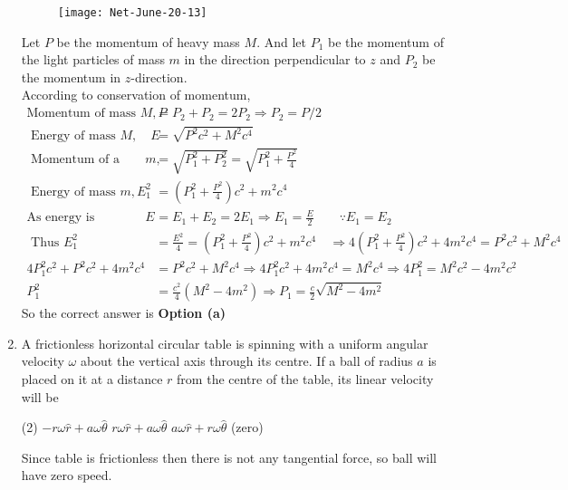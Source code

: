 \begin{enumerate}
\begin{answer}
\begin{figure}[H]
		\centering
		\texttt{[image: Net-June-20-13]}
	\end{figure}
	Let $P$ be the momentum of heavy mass $M$. And let $P_{1}$ be the momentum of the light particles of mass $m$ in the direction perpendicular to $z$ and $P_{2}$ be the momentum in $z$-direction.\\
	According to conservation of momentum,
	\begin{align*}
	\text{Momentum of mass }M, P&=P_{2}+P_{2}=2 P_{2} \Rightarrow P_{2}=P / 2\\
\text{	Energy of mass } M, \quad E&=\sqrt{P^{2} c^{2}+M^{2} c^{4}}\\
\text{	Momentum of a mass } m,&=\sqrt{P_{1}^{2}+P_{2}^{2}}=\sqrt{P_{1}^{2}+\frac{P^{2}}{4}}\\
\text{	Energy of mass }m, E_{1}^{2}&=\left(P_{1}^{2}+\frac{P^{2}}{4}\right) c^{2}+m^{2} c^{4}\\
	\text{As energy is conserved }E&=E_{1}+E_{2}=2 E_{1} \Rightarrow E_{1}=\frac{E}{2}\qquad \because E_{1}=E_{2}\\
\text{	Thus } E_{1}^{2}&=\frac{E^{2}}{4}=\left(P_{1}^{2}+\frac{P^{2}}{4}\right) c^{2}+m^{2} c^{4} \quad \Rightarrow 4\left(P_{1}^{2}+\frac{P^{2}}{4}\right) c^{2}+4 m^{2} c^{4}=P^{2} c^{2}+M^{2} c^{4} \\
4 P_{1}^{2} c^{2}+P^{2} c^{2}+4 m^{2} c^{4}&=P^{2} c^{2}+M^{2} c^{4} \Rightarrow 4 P_{1}^{2} c^{2}+4 m^{2} c^{4}=M^{2} c^{4} \Rightarrow 4 P_{1}^{2}=M^{2} c^{2}-4 m^{2} c^{2}\\ P_{1}^{2}&=\frac{c^{2}}{4}\left(M^{2}-4 m^{2}\right) \Rightarrow P_{1}=\frac{c}{2} \sqrt{M^{2}-4 m^{2}}
	\end{align*}
		So the correct answer is \textbf{Option (a)}
\end{answer}
\item A frictionless horizontal circular table is spinning with a uniform angular velocity $\omega$ about the vertical axis through its centre. If a ball of radius $a$ is placed on it at a distance $r$ from the centre of the table, its linear velocity will be
 \begin{tasks}(2)
	\task[\textbf{a.}]$-r \omega \hat{r}+a \omega \hat{\theta}$
	\task[\textbf{b.}]$r \omega \hat{r}+a \omega \hat{\theta}$
	\task[\textbf{c.}]$a \omega \hat{r}+r \omega \hat{\theta}$
	 (zero)
\end{tasks}
\begin{answer}
 Since table is frictionless then there is not any tangential force, so ball will have zero speed. \\

\end{answer}
\end{enumerate}

